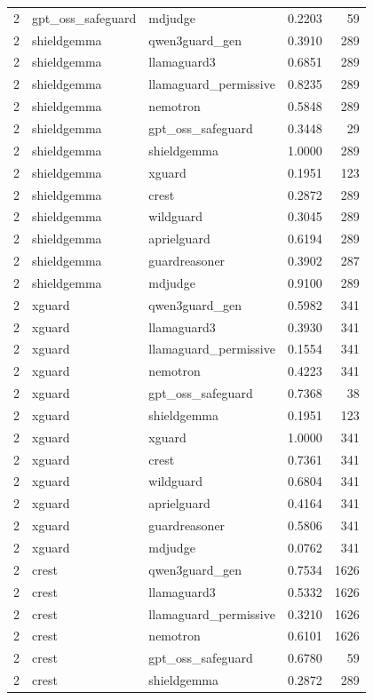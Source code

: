 \begin{tabular}{rllrr}
2 & gpt\_oss\_safeguard & mdjudge & 0.2203 & 59 \\
2 & shieldgemma & qwen3guard\_gen & 0.3910 & 289 \\
2 & shieldgemma & llamaguard3 & 0.6851 & 289 \\
2 & shieldgemma & llamaguard\_permissive & 0.8235 & 289 \\
2 & shieldgemma & nemotron & 0.5848 & 289 \\
2 & shieldgemma & gpt\_oss\_safeguard & 0.3448 & 29 \\
2 & shieldgemma & shieldgemma & 1.0000 & 289 \\
2 & shieldgemma & xguard & 0.1951 & 123 \\
2 & shieldgemma & crest & 0.2872 & 289 \\
2 & shieldgemma & wildguard & 0.3045 & 289 \\
2 & shieldgemma & aprielguard & 0.6194 & 289 \\
2 & shieldgemma & guardreasoner & 0.3902 & 287 \\
2 & shieldgemma & mdjudge & 0.9100 & 289 \\
2 & xguard & qwen3guard\_gen & 0.5982 & 341 \\
2 & xguard & llamaguard3 & 0.3930 & 341 \\
2 & xguard & llamaguard\_permissive & 0.1554 & 341 \\
2 & xguard & nemotron & 0.4223 & 341 \\
2 & xguard & gpt\_oss\_safeguard & 0.7368 & 38 \\
2 & xguard & shieldgemma & 0.1951 & 123 \\
2 & xguard & xguard & 1.0000 & 341 \\
2 & xguard & crest & 0.7361 & 341 \\
2 & xguard & wildguard & 0.6804 & 341 \\
2 & xguard & aprielguard & 0.4164 & 341 \\
2 & xguard & guardreasoner & 0.5806 & 341 \\
2 & xguard & mdjudge & 0.0762 & 341 \\
2 & crest & qwen3guard\_gen & 0.7534 & 1626 \\
2 & crest & llamaguard3 & 0.5332 & 1626 \\
2 & crest & llamaguard\_permissive & 0.3210 & 1626 \\
2 & crest & nemotron & 0.6101 & 1626 \\
2 & crest & gpt\_oss\_safeguard & 0.6780 & 59 \\
2 & crest & shieldgemma & 0.2872 & 289 \\

\end{tabular}
